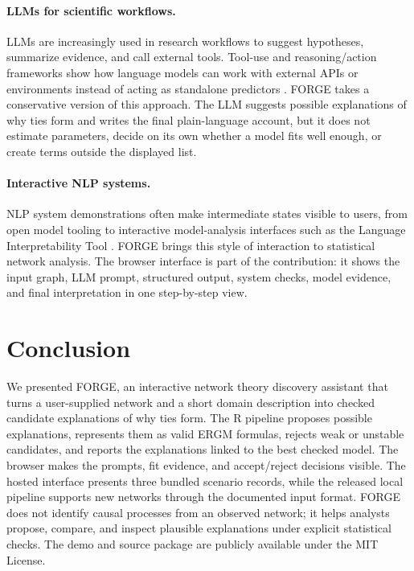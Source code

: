 \documentclass[11pt]{article}
\begin{document}
\paragraph{LLMs for scientific workflows.}
LLMs are increasingly used in research workflows to suggest hypotheses, summarize evidence, and call external tools. Tool-use and reasoning/action frameworks show how language models can work with external APIs or environments instead of acting as standalone predictors \citep{yao2023react,schick2023toolformer}. FORGE takes a conservative version of this approach. The LLM suggests possible explanations of why ties form and writes the final plain-language account, but it does not estimate parameters, decide on its own whether a model fits well enough, or create terms outside the displayed list.

\paragraph{Interactive NLP systems.}
NLP system demonstrations often make intermediate states visible to users, from open model tooling \citep{wolf2020transformers} to interactive model-analysis interfaces such as the Language Interpretability Tool \citep{tenney2020lit}. FORGE brings this style of interaction to statistical network analysis. The browser interface is part of the contribution: it shows the input graph, LLM prompt, structured output, system checks, model evidence, and final interpretation in one step-by-step view.


\section{Conclusion}
\label{sec:conclusion}

We presented FORGE, an interactive network theory discovery assistant that turns a user-supplied network and a short domain description into checked candidate explanations of why ties form. The R pipeline proposes possible explanations, represents them as valid ERGM formulas, rejects weak or unstable candidates, and reports the explanations linked to the best checked model. The browser makes the prompts, fit evidence, and accept/reject decisions visible. The hosted interface presents three bundled scenario records, while the released local pipeline supports new networks through the documented input format. FORGE does not identify causal processes from an observed network; it helps analysts propose, compare, and inspect plausible explanations under explicit statistical checks. The demo and source package are publicly available under the MIT License.
\end{document}
